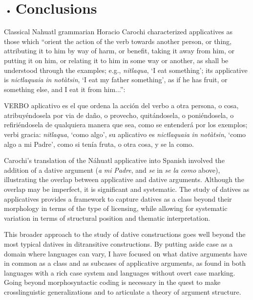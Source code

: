 \documentclass[output=paper,modfonts,nonflat]{langsci/langscibook}
\begin{document}
\begin{itemize}
\item \section{Conclusions}
\end{itemize}

Classical Nahuatl grammarian Horacio Carochi characterized applicatives as those which “orient the action of the verb towards another person, or thing, attributing it to him by way of harm, or benefit, taking it away from him, or putting it on him, or relating it to him in some way or another, as shall be understood through the examples; e.g., \textit{nitlaqua}, ‘I eat something’; its applicative is \textit{nictlaquaia} \textit{in} \textit{notàtsin}, ‘I eat my father something’, as if he has fruit, or something else, and I eat it from him...”: 

VERBO aplicativo es el que ordena la acción del verbo a otra persona, o cosa, atribuyéndosela por via de daño, o provecho, quitándosela, o poniéndosela, o refiriéndosela de qualquiera manera que sea, como se entenderá por los exemplos; verbi gracia: \textit{nitlaqua}, ‘como algo’, su aplicativo es \textit{nictlaquaia} \textit{in} \textit{notàtsin}, ‘como algo a mi Padre’, como si tenía fruta, o otra cosa, y se la como. \citep[466]{Carochi1645}

Carochi’s translation of the Náhuatl applicative into Spanish involved the addition of a dative argument (\textit{a} \textit{mi} \textit{Padre}, and \textit{se} in \textit{se} \textit{la} \textit{como} above),  illustrating the overlap between applicative and dative arguments. Although the overlap may be imperfect, it is significant and systematic. The study of datives as applicatives provides a framework to capture datives as a class beyond their morphology in terms of the type of licensing, while allowing for systematic variation in terms of structural position and thematic interpretation. 

This broader approach to the study of dative constructions goes well beyond the most typical datives in ditransitive constructions. By putting aside case as a domain where languages can vary, I have focused on what dative arguments have in common as a class and as subcases of applicative arguments, as found in both languages with a rich case system and languages without overt case marking. Going beyond morphosyntactic coding is necessary in the quest to make crosslinguistic generalizations and to articulate a theory of argument structure.
\end{document}
